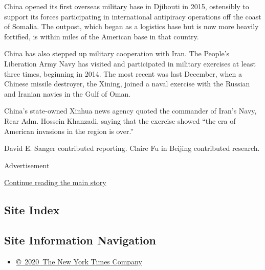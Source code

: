 China opened its first overseas military base in Djibouti in 2015,
ostensibly to support its forces participating in international
antipiracy operations off the coast of Somalia. The outpost, which began
as a logistics base but is now more heavily fortified, is within miles
of the American base in that country.

China has also stepped up military cooperation with Iran. The People's
Liberation Army Navy has visited and participated in military exercises
at least three times, beginning in 2014. The most recent was last
December, when a Chinese missile destroyer, the Xining, joined a naval
exercise with the Russian and Iranian navies in the Gulf of Oman.

China's state-owned Xinhua news agency quoted the commander of Iran's
Navy, Rear Adm. Hossein Khanzadi, saying that the exercise showed ``the
era of American invasions in the region is over.''

David E. Sanger contributed reporting. Claire Fu in Beijing contributed
research.

Advertisement

\protect\hyperlink{after-bottom}{Continue reading the main story}

\hypertarget{site-index}{%
\subsection{Site Index}\label{site-index}}

\hypertarget{site-information-navigation}{%
\subsection{Site Information
Navigation}\label{site-information-navigation}}

\begin{itemize}
\tightlist
\item
  \href{https://help.nytimes.com/hc/en-us/articles/115014792127-Copyright-notice}{©~2020~The
  New York Times Company}
\end{itemize}

